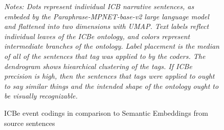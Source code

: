 \documentclass{article}
\begin{document}
\begin{figure}[H]
\caption{ICBe event codings in comparison to Semantic Embeddings from source sentences\label{fig:semantic_embeddings}}
\textit{Notes: Dots represent individual ICB narrative sentences, as embeded by the Paraphrase-MPNET-base-v2 large language model and flattened into two dimensions with UMAP. Text labels reflect individual leaves of the ICBe ontology, and colors represent intermediate branches of the ontology. Label placement is the median of all of the sentences that tag was applied to by the coders. The dendrogram shows hiearchical clustering of the tags. If ICBe precision is high, then the sentences that tags were applied to ought to say similar things and the intended shape of the ontology ought to be visually recognizable. }
\end{figure}
\clearpage

\clearpage
\end{document}
